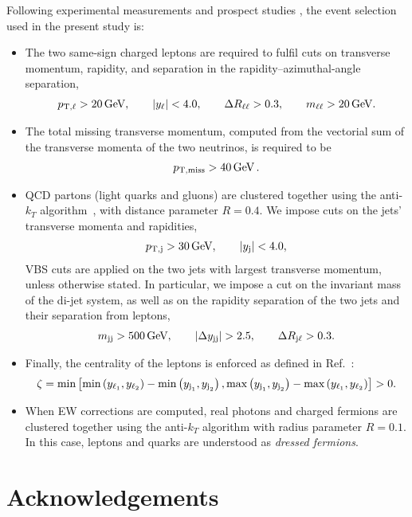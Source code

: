 \documentclass[11pt,epsf]{article}
\begin{document}
    Following experimental measurements \cite{Aad:2014zda,Aaboud:2016ffv,Khachatryan:2014sta,CMS:2017adb} and prospect studies \cite{ATL-PHYS-PUB-2017-023}, the event selection used in the present study is:

    \begin{itemize}
        \item The two same-sign charged leptons are required to fulfil cuts on transverse momentum, rapidity, and separation in the rapidity--azimuthal-angle separation, 
            \begin{align}
            \label{cut:1}
             p_{\text{T},\ell} >  20\,\text{GeV},\qquad |y_{\ell}| < 4.0, \qquad \Delta R_{\ell\ell}> 0.3, \qquad m_{\ell\ell}>20\,\text{GeV}.
            \end{align}
        \item The total missing transverse momentum, computed from the vectorial sum of the transverse momenta of the two neutrinos, is required to be
            \begin{align}
            \label{cut:2}
              p_{\rm T, miss} >  40\,\text{GeV}\,.
            \end{align}
        \item QCD partons (light quarks and gluons) are clustered together using the anti-$k_T$ algorithm~\cite{Cacciari:2008gp}, with distance parameter $R=0.4$.
        We impose cuts on the jets' transverse momenta and rapidities,  
            \begin{align}
            \label{cut:3}
             p_{\text{T},\text{j}} >  30\,\text{GeV}, \qquad |y_\text{j}| < 4.0, 
            \end{align}
            VBS cuts are applied on the two jets with largest transverse momentum, unless otherwise stated. In particular, we impose a cut on the 
             in\-vari\-ant mass of the di-jet system, as well as on the rapidity separation of the two jets and their separation from leptons,
            \begin{align}
            \label{cut:4}
             m_{\text{j} \text{j}} >  500\,\text{GeV},\qquad |\Delta y_{\text{j} \text{j}}| > 2.5, \qquad \Delta R_{\text{j}\ell} > 0.3 .
            \end{align}
        \item Finally, the centrality of the leptons is enforced as defined in Ref.~\cite{ATL-PHYS-PUB-2017-023}:
            \begin{align}
            \label{cut:5}
             \zeta = \text{min}\left[\text{min}\left(y_{\ell_1},y_{\ell_2}\right) - \text{min}\left(y_{\text{j}_1},y_{\text{j}_2}\right), \text{max}\left(y_{\text{j}_1},y_{\text{j}_2}\right) - \text{max}\left(y_{\ell_1},y_{\ell_2}\right)\right]> 0 .
            \end{align}
            
        \item When EW corrections are computed, real photons and charged fermions are clustered together using the anti-$k_T$ algorithm with
            radius parameter $R=0.1$. In this case, leptons and quarks are understood as {\it dressed fermions}.
    \end{itemize}


\section*{Acknowledgements}

\appendix




\end{document}
